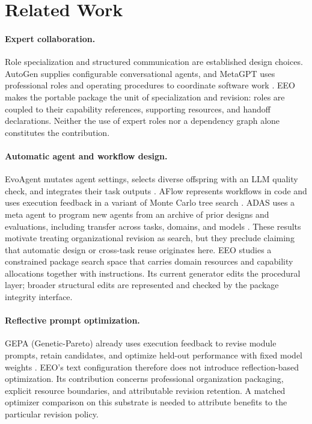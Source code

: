 \section{Related Work}\label{sec:related}
\paragraph{Expert collaboration.}
Role specialization and structured communication are established design choices. AutoGen supplies configurable conversational agents, and MetaGPT uses professional roles and operating procedures to coordinate software work \citep{autogen,metagpt}. EEO makes the portable package the unit of specialization and revision: roles are coupled to their capability references, supporting resources, and handoff declarations. Neither the use of expert roles nor a dependency graph alone constitutes the contribution.

\paragraph{Automatic agent and workflow design.}
EvoAgent mutates agent settings, selects diverse offspring with an LLM quality check, and integrates their task outputs \citep{evoagent}. AFlow represents workflows in code and uses execution feedback in a variant of Monte Carlo tree search \citep{aflow}. ADAS uses a meta agent to program new agents from an archive of prior designs and evaluations, including transfer across tasks, domains, and models \citep{adas}. These results motivate treating organizational revision as search, but they preclude claiming that automatic design or cross-task reuse originates here. EEO studies a constrained package search space that carries domain resources and capability allocations together with instructions. Its current generator edits the procedural layer; broader structural edits are represented and checked by the package integrity interface.

\paragraph{Reflective prompt optimization.}
GEPA (Genetic-Pareto) already uses execution feedback to revise module prompts, retain candidates, and optimize held-out performance with fixed model weights \citep{gepa}. EEO's text configuration therefore does not introduce reflection-based optimization. Its contribution concerns professional organization packaging, explicit resource boundaries, and attributable revision retention. A matched optimizer comparison on this substrate is needed to attribute benefits to the particular revision policy.

